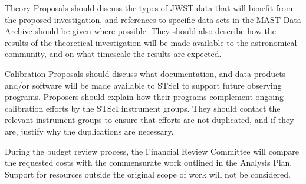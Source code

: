 \documentclass[12pt]{article}
\begin{document}
\smallskip
\smallskip
\noindent
Theory Proposals should discuss the types of JWST data that will benefit from the proposed investigation, and references to specific data sets in the MAST Data Archive should be given where possible. They should also describe how the results of the theoretical investigation will be made available to the astronomical community, and on what timescale the results are expected.

\smallskip
\smallskip
\noindent
Calibration Proposals should discuss what documentation, and data products and/or software will be made available to STScI to support future observing programs. Proposers should explain how their programs complement ongoing calibration efforts by the STScI instrument groups. They should contact the relevant instrument groups to ensure that efforts are not duplicated, and if they are, justify why the duplications are necessary.

\smallskip
\smallskip
\noindent
During the budget review process, the Financial Review Committee will compare the requested costs with the commensurate work outlined in the Analysis Plan. Support for resources outside the original scope of work will not be considered.
\end{document}
